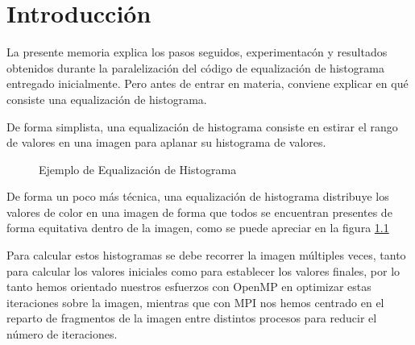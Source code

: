 \documentclass[12pt]{report} %
\begin{document}
\listoffigures
\thispagestyle{fancy}


\clearpage
{} %

\chapter{Introducción}
\label{chap:Intro}

La presente memoria explica los pasos seguidos, experimentacón y resultados obtenidos durante la
paralelización del código de equalización de histograma entregado inicialmente. Pero antes de entrar
en materia, conviene explicar en qué consiste una equalización de histograma.

De forma simplista, una equalización de histograma consiste en estirar el rango de valores en una
imagen para aplanar su histograma de valores.

\begin{figure}[H]
    \caption{Ejemplo de Equalización de Histograma}
    \label{fig:hist_eq}
\end{figure}

De forma un poco más técnica, una equalización de histograma distribuye los valores de color en una imagen de
forma que todos se encuentran presentes de forma equitativa dentro de la imagen, como se puede apreciar
en la figura \ref{fig:hist_eq} 

Para calcular estos histogramas se debe recorrer la imagen múltiples veces, tanto para
calcular los valores iniciales como para establecer los valores finales, por lo tanto hemos orientado
nuestros esfuerzos con OpenMP \parencite{openmp_openmp_2004} en optimizar estas iteraciones sobre
la imagen, mientras que con MPI \parencite{spi-inc_open_2004} nos hemos centrado en el reparto
de fragmentos de la imagen entre distintos procesos para reducir el número de iteraciones.
\end{document}
